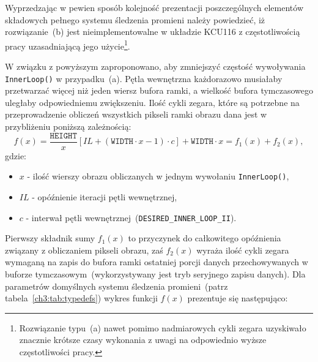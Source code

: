 \begin{enumerate}
Wyprzedzając w pewien sposób kolejność prezentacji poszczególnych elementów składowych pełnego systemu śledzenia promieni należy powiedzieć, iż rozwiązanie~(b) jest nieimplementowalne w układzie KCU116 z częstotliwością pracy uzasadniającą jego użycie\footnote{Rozwiązanie typu~(a) nawet pomimo nadmiarowych cykli zegara uzyskiwało znacznie krótsze czasy wykonania z uwagi na odpowiednio wyższe częstotliwości pracy.}. 

W związku z powyższym zaproponowano, aby zmniejszyć częstość wywoływania \texttt{InnerLoop()} w przypadku~(a). Pętla wewnętrzna każdorazowo musiałaby przetwarzać więcej niż jeden wiersz bufora ramki, a wielkość bufora tymczasowego uległaby odpowiedniemu zwiększeniu. Ilość cykli zegara, które są potrzebne na przeprowadzenie obliczeń wszystkich pikseli ramki obrazu dana jest w przybliżeniu poniższą zależnością:
\begin{equation}
f(x) = \frac{\mathtt{HEIGHT}}{x}\left[IL + \left(\mathtt{WIDTH}\cdot x - 1 \right) \cdot c \right] + \mathtt{WIDTH}\cdot x = f_1(x) + f_2(x),
\label{ch3:eq:dataflow_latency}
\end{equation}
gdzie:
\begin{itemize}
\item[] $x$ - ilość wierszy obrazu obliczanych w jednym wywołaniu \texttt{InnerLoop()},
\item[] $IL$ - opóźnienie iteracji pętli wewnętrznej,
\item[] $c$ - interwał pętli wewnętrznej~(\texttt{DESIRED\_INNER\_LOOP\_II}).
\end{itemize}
Pierwszy składnik sumy $f_1(x)$ to przyczynek do całkowitego opóźnienia związany z obliczaniem pikseli obrazu, zaś $f_2(x)$ wyraża ilość cykli zegara wymaganą na zapis do bufora ramki ostatniej porcji danych przechowywanych w buforze tymczasowym~(wykorzystywany jest tryb seryjnego zapisu danych). Dla parametrów domyślnych systemu śledzenia promieni~(patrz tabela~\ref{ch3:tab:typedefs}) wykres funkcji $f(x)$ prezentuje się następująco:



\end{enumerate}
